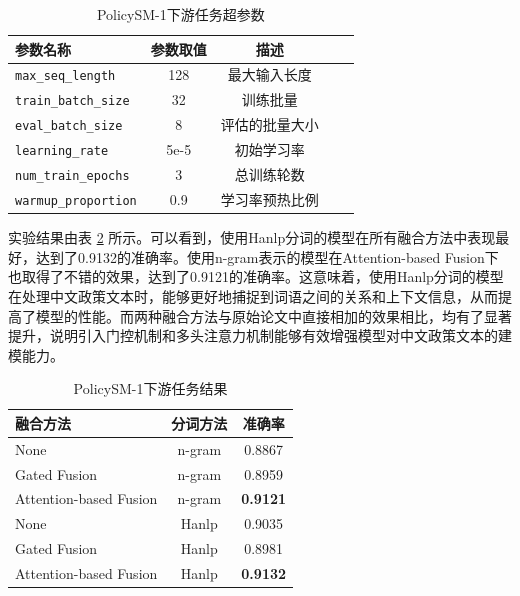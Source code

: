 \documentclass[12pt, a4paper]{ctexart}
\begin{document}
\begin{table}[H]
    \centering
    \begin{tabular}{lcccc}
        \toprule
        \textbf{参数名称} & \textbf{参数取值} & \textbf{描述} \\ 
        \midrule
        \texttt{max\_seq\_length} & 128 & 最大输入长度\\ 
        \texttt{train\_batch\_size} & 32 & 训练批量 \\ 
        \texttt{eval\_batch\_size} & 8 & 评估的批量大小 \\
        \texttt{learning\_rate} & 5e-5 & 初始学习率 \\
        \texttt{num\_train\_epochs} & 3 & 总训练轮数 \\ 
        \texttt{warmup\_proportion} & 0.9 & 学习率预热比例 \\
        \bottomrule
    \end{tabular}
    \caption{PolicySM-1下游任务超参数}
    \label{tab:seqlevel_hyperparameters_1}
\end{table}

实验结果由表 \ref{tab:fusion_results_1} 所示。可以看到，使用Hanlp分词的模型在所有融合方法中表现最好，达到了0.9132的准确率。使用n-gram表示的模型在Attention-based Fusion下也取得了不错的效果，达到了0.9121的准确率。这意味着，使用Hanlp分词的模型在处理中文政策文本时，能够更好地捕捉到词语之间的关系和上下文信息，从而提高了模型的性能。而两种融合方法与原始论文中直接相加的效果相比，均有了显著提升，说明引入门控机制和多头注意力机制能够有效增强模型对中文政策文本的建模能力。

\begin{table}[ht]
    \centering
    \begin{tabular}{lcc}
    \hline
    \textbf{融合方法} & \textbf{分词方法} & \textbf{准确率} \\
    \hline
    None                   & n-gram                   & 0.8867 \\
    Gated Fusion           & n-gram                  & 0.8959 \\
    Attention-based Fusion   & n-gram                 & \textbf{0.9121}\\
    \hline
    None                   & Hanlp                       & 0.9035 \\
    Gated Fusion           & Hanlp                       & 0.8981 \\
    Attention-based Fusion   & Hanlp                     & \textbf{0.9132} \\
    \hline
    \end{tabular}
    \caption{PolicySM-1下游任务结果}
    \label{tab:fusion_results_1}
\end{table}
\end{document}
